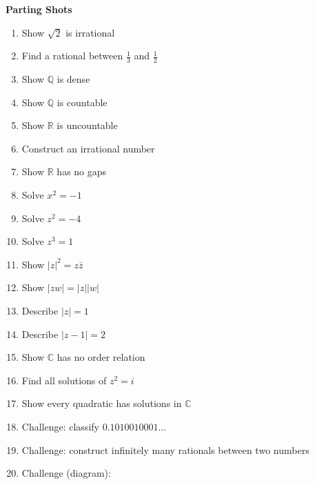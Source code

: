 \documentclass[11pt]{article}
\newcommand{\Q}{\mathbb{Q}}
\newcommand{\R}{\mathbb{R}}
\newcommand{\C}{\mathbb{C}}
\begin{document}
\begin{problembox}

\textbf{Parting Shots}

\begin{enumerate}

\item Show $\sqrt{2}$ is irrational
\item Find a rational between $\frac{1}{3}$ and $\frac{1}{2}$
\item Show $\Q$ is dense
\item Show $\Q$ is countable
\item Show $\R$ is uncountable

\item Construct an irrational number
\item Show $\R$ has no gaps
\item Solve $x^2 = -1$
\item Solve $z^2 = -4$
\item Solve $z^3 = 1$

\item Show $|z|^2 = z\bar{z}$
\item Show $|zw| = |z||w|$
\item Describe $|z| = 1$
\item Describe $|z - 1| = 2$

\item Show $\C$ has no order relation

\item Find all solutions of $z^2 = i$
\item Show every quadratic has solutions in $\C$

\item Challenge: classify $0.1010010001\dots$
\item Challenge: construct infinitely many rationals between two numbers

\item Challenge (diagram):

\begin{center}
\end{center}

\end{enumerate}

\end{problembox}
\end{document}
